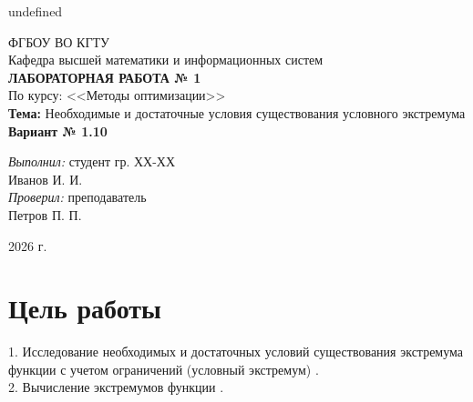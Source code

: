 undefined
\usepackage[utf8]{inputenc}
\usepackage[russian]{babel}
\usepackage{amsmath,amssymb,amsfonts}
\usepackage{geometry}
\usepackage{graphicx}
\usepackage{listings}
\usepackage{xcolor}

\geometry{top=2cm,bottom=2cm,left=3cm,right=1.5cm}




\begin{titlepage}
    \centering
    \vspace*{1cm}
    \large ФГБОУ ВО КГТУ \\
    \large Кафедра высшей математики и информационных систем \\
    \vspace{4cm}
    \Large \textbf{ЛАБОРАТОРНАЯ РАБОТА № 1} \\
    \large По курсу: <<Методы оптимизации>> \\
    \large \textbf{Тема:} Необходимые и достаточные условия существования условного экстремума \\
    \vspace{1cm}
    \large \textbf{Вариант № 1.10} \\
    \vspace{4cm}
    \begin{flushright}
        \large \textit{Выполнил:} студент гр. ХХ-ХХ \\
        Иванов И. И. \\
        \vspace{0.5cm}
        \textit{Проверил:} преподаватель \\
        Петров П. П. \\
    \end{flushright}
    \vfill
    2026 г.
\end{titlepage}

\newpage

\section{Цель работы}
1. Исследование необходимых и достаточных условий существования экстремума функции с учетом ограничений (условный экстремум) \cite{cite: 5}.\\
2. Вычисление экстремумов функции \cite{cite: 5}.

